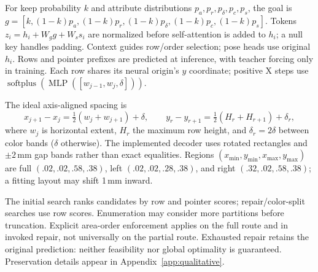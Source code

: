 For keep probability $k$ and attribute distributions $p_a,p_r,p_\delta,p_c,p_s$, the goal is $g=[k,(1-k)p_a,(1-k)p_r,(1-k)p_\delta,(1-k)p_c,(1-k)p_s]$. Tokens $z_i=h_i+W_g g+W_s s_i$ are normalized before self-attention is added to $h_i$; a null key handles padding. Context guides row/order selection; pose heads use original $h_i$. Rows and pointer prefixes are predicted at inference, with teacher forcing only in training. Each row shares its neural origin's $y$ coordinate; positive X steps use $\operatorname{softplus}(\operatorname{MLP}([w_{j-1},w_j,\delta]))$.

The ideal axis-aligned spacing is
\begin{equation}
 x_{j+1}-x_j=\tfrac12(w_j+w_{j+1})+\delta,\qquad
 y_r-y_{r+1}=\tfrac12(H_r+H_{r+1})+\delta_r,
\label{eq:spacing}
\end{equation}
where $w_j$ is horizontal extent, $H_r$ the maximum row height, and $\delta_r=2\delta$ between color bands ($\delta$ otherwise). The implemented decoder uses rotated rectangles and $\pm2$\,mm gap bands rather than exact equalities. Regions $(x_{\min},y_{\min},x_{\max},y_{\max})$ are full $(.02,.02,.58,.38)$, left $(.02,.02,.28,.38)$, and right $(.32,.02,.58,.38)$; a fitting layout may shift 1\,mm inward.

The initial search ranks candidates by row and pointer scores; repair/color-split searches use row scores. Enumeration may consider more partitions before truncation. Explicit area-order enforcement applies on the full route and in invoked repair, not universally on the partial route. Exhausted repair retains the original prediction: neither feasibility nor global optimality is guaranteed. Preservation details appear in Appendix~\ref{app:qualitative}.

\clearpage
